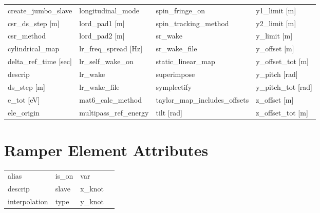 \begin{tabular}{llll}
create_jumbo_slave               & longitudinal_mode                & spin_fringe_on                   & y1_limit [m]                     \\
csr_ds_step [m]                  & lord_pad1 [m]                    & spin_tracking_method             & y2_limit [m]                     \\
csr_method                       & lord_pad2 [m]                    & sr_wake                          & y_limit [m]                      \\
cylindrical_map                  & lr_freq_spread [Hz]              & sr_wake_file                     & y_offset [m]                     \\
delta_ref_time [sec]             & lr_self_wake_on                  & static_linear_map                & y_offset_tot [m]                 \\
descrip                          & lr_wake                          & superimpose                      & y_pitch [rad]                    \\
ds_step [m]                      & lr_wake_file                     & symplectify                      & y_pitch_tot [rad]                \\
e_tot [eV]                       & mat6_calc_method                 & taylor_map_includes_offsets      & z_offset [m]                     \\
ele_origin                       & multipass_ref_energy             & tilt [rad]                       & z_offset_tot [m]                 \\
 \bottomrule
 \end{tabular}
 \vfill
 
 \section{Ramper Element Attributes}
 \label{s:list.ramper}
 
 \begin{tabular}{llll} \toprule
alias                            & is_on                            & var                              &                                  \\
descrip                          & slave                            & x_knot                           &                                  \\
interpolation                    & type                             & y_knot                           &                                  \\
 \bottomrule
 \end{tabular}
 \vfill
 
